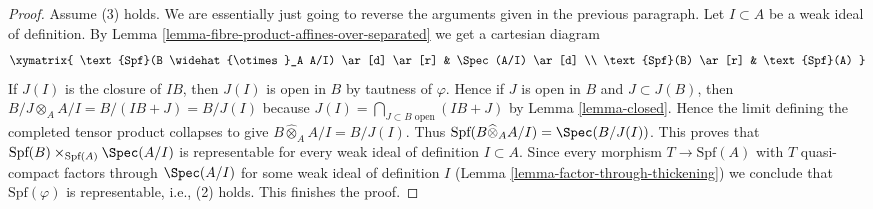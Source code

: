 \begin{proof}
\medskip\noindent
Assume (3) holds. We are essentially just going to reverse the
arguments given in the previous paragraph.
Let $I \subset A$ be a weak ideal of definition.
By Lemma \ref{lemma-fibre-product-affines-over-separated}
we get a cartesian diagram
$$
\xymatrix{
\text{Spf}(B \widehat{\otimes}_A A/I) \ar[d] \ar[r] & \Spec(A/I) \ar[d] \\
\text{Spf}(B) \ar[r] & \text{Spf}(A)
}
$$
If $J(I)$ is the closure of $IB$, then $J(I)$ is open in $B$
by tautness of $\varphi$. Hence if $J$ is open in $B$ and $J \subset J(B)$,
then $B/J \otimes_A A/I = B/(IB + J) = B/J(I)$ because
$J(I) = \bigcap_{J \subset B\text{ open}} (IB + J)$ by Lemma \ref{lemma-closed}.
Hence the limit defining the completed tensor product collapses to give
$B \widehat{\otimes}_A A/I = B/J(I)$.
Thus $\text{Spf}(B \widehat{\otimes}_A A/I) = \Spec(B/J(I))$.
This proves that $\text{Spf}(B) \times_{\text{Spf}(A)} \Spec(A/I)$
is representable for every weak ideal of definition $I \subset A$.
Since every morphism $T \to \text{Spf}(A)$ with $T$ quasi-compact
factors through $\Spec(A/I)$ for some weak ideal of definition $I$
(Lemma \ref{lemma-factor-through-thickening})
we conclude that $\text{Spf}(\varphi)$ is representable, i.e.,
(2) holds. This finishes the proof.
\end{proof}